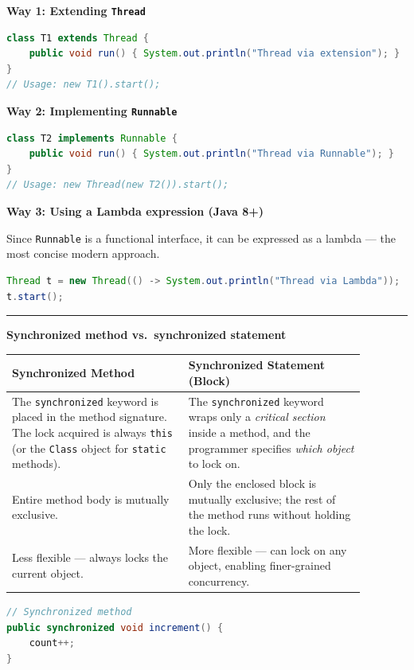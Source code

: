 \documentclass[12pt,a3paper]{article}
\begin{document}
\begin{enumerate}
\begin{tcolorbox}
\textbf{Way 1: Extending \texttt{Thread}}
\begin{lstlisting}[language=Java]
class T1 extends Thread {
    public void run() { System.out.println("Thread via extension"); }
}
// Usage: new T1().start();
\end{lstlisting}

\medskip
\textbf{Way 2: Implementing \texttt{Runnable}}
\begin{lstlisting}[language=Java]
class T2 implements Runnable {
    public void run() { System.out.println("Thread via Runnable"); }
}
// Usage: new Thread(new T2()).start();
\end{lstlisting}

\medskip
\textbf{Way 3: Using a Lambda expression (Java 8+)}

Since \texttt{Runnable} is a functional interface, it can be expressed
as a lambda — the most concise modern approach.
\begin{lstlisting}[language=Java]
Thread t = new Thread(() -> System.out.println("Thread via Lambda"));
t.start();
\end{lstlisting}

\medskip
\textcolor{cB}{\rule{\textwidth}{0.4pt}}
\medskip

\textbf{Synchronized method vs.\ synchronized statement}

\begin{center}
\begin{tabular}{@{}p{0.44\linewidth}p{0.44\linewidth}@{}}
\toprule
\textbf{Synchronized Method} & \textbf{Synchronized Statement (Block)} \\
\midrule
The \texttt{synchronized} keyword is placed in the method signature.
The lock acquired is always \texttt{this} (or the \texttt{Class} object
for \texttt{static} methods). &
The \texttt{synchronized} keyword wraps only a \emph{critical section}
inside a method, and the programmer specifies \emph{which object} to
lock on. \\[6pt]
Entire method body is mutually exclusive. &
Only the enclosed block is mutually exclusive; the rest of the method
runs without holding the lock. \\[6pt]
Less flexible — always locks the current object. &
More flexible — can lock on any object, enabling finer-grained
concurrency. \\
\bottomrule
\end{tabular}
\end{center}

\begin{lstlisting}[language=Java]
// Synchronized method
public synchronized void increment() {
    count++;
}


\end{lstlisting}
\end{tcolorbox}
\end{enumerate}
\end{document}

